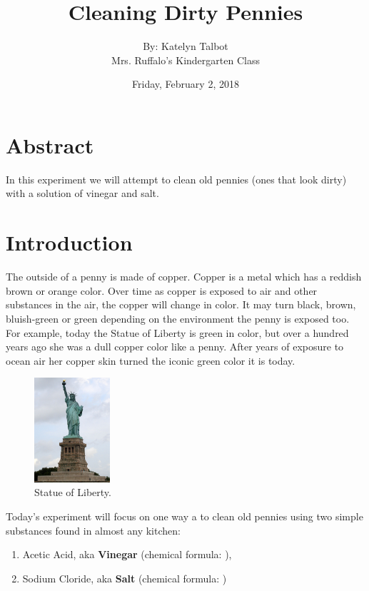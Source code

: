\documentclass[12pt,twoside,a4]{article}
\begin{document}
\title{Cleaning Dirty Pennies}
\date{Friday, February 2, 2018}
\author{By: Katelyn Talbot\\
\small Mrs. Ruffalo's Kindergarten Class}
\maketitle
\section{Abstract}
In this experiment we will attempt to clean old pennies (ones that look dirty) with a solution of vinegar and salt.

\section{Introduction}
The outside of a penny is made of copper.  Copper is a metal which has a reddish brown or orange color.  Over time as copper is exposed to air and other substances in the air, the copper will change in color. It may turn black, brown, bluish-green or green depending on the environment the penny is exposed too.  For example, today the Statue of Liberty is green in color, but over a hundred years ago she was a dull copper color like a penny.  After years of exposure to ocean air her copper skin turned the iconic green color it is today.
\begin{figure}
\centering
\includegraphics[width=0.25\textwidth]{Statue_of_Liberty.jpg}
\caption{Statue of Liberty.}\label{sol}
\end{figure}

Today's experiment will focus on one way a to clean old pennies using two simple substances found in almost any kitchen:
\begin{enumerate}[noitemsep]
\item Acetic Acid, aka \textbf{Vinegar} (chemical formula: ),
\item Sodium Cloride, aka \textbf{Salt} (chemical formula: )
\end{enumerate}
\end{document}
